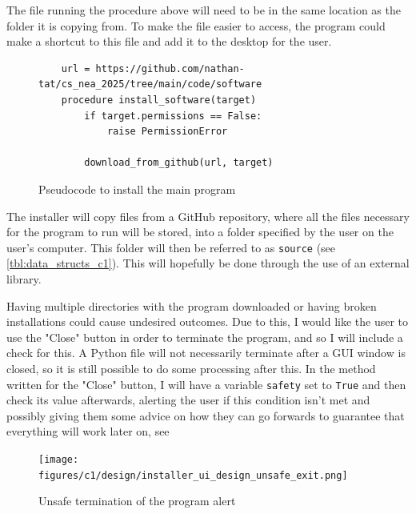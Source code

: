 \documentclass[11pt]{article}
\begin{document}
                The file running the procedure above will need to be in the same location as the folder it is copying from. To make the file easier to access, the program could make a shortcut to this file and add it to the desktop for the user.
                

                \begin{figure}[!ht]
                    \begin{verbatim}
    url = https://github.com/nathan-tat/cs_nea_2025/tree/main/code/software
    procedure install_software(target)
        if target.permissions == False:
            raise PermissionError
        
        download_from_github(url, target)
                    \end{verbatim}
                    \caption{Pseudocode to install the main program}
                    \label{pc:install_software_ps_c1}
                \end{figure}


                The installer will copy files from a GitHub repository, where all the files necessary for the program to run will be stored, into a folder specified by the user on the user's computer. This folder will then be referred to as \verb|source| (see \autoref{tbl:data_structs_c1}). This will hopefully be done through the use of an external library.

                Having multiple directories with the program downloaded or having broken installations could cause undesired outcomes. Due to this, I would like the user to use the "Close" button in order to terminate the program, and so I will include a check for this. A Python file will not necessarily terminate after a GUI window is closed, so it is still possible to do some processing after this. In the method written for the "Close" button, I will have a variable \verb|safety| set to \verb|True| and then check its value afterwards, alerting the user if this condition isn't met and possibly giving them some advice on how they can go forwards to guarantee that everything will work later on, see 

                \begin{figure}[!ht]
                    \centering
                    \texttt{[image: figures/c1/design/installer\_ui\_design\_unsafe\_exit.png]}
                    \caption{Unsafe termination of the program alert}
                    \label{fig:installer_ui_design_unsafe_exit_c1}
                \end{figure}
\end{document}
